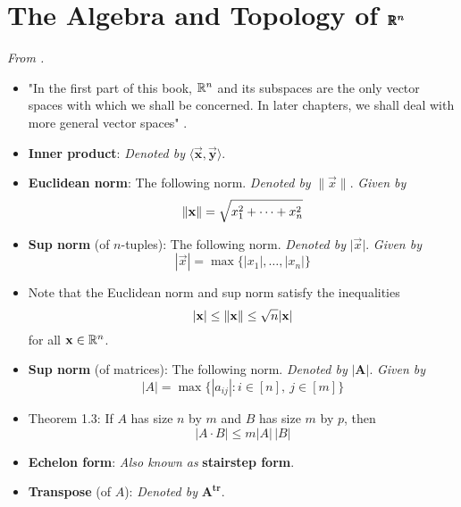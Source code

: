 \documentclass[../notes.tex]{subfiles}
\begin{document}
\section[The Algebra and Topology of \texorpdfstring{$\R^n$}{TEXT}]{The Algebra and Topology of \texorpdfstring{$\pmb{\mathbb{R}}^{\bm{n}}$}{TEXT}}
\emph{From \textcite{bib:Munkres}.}
\begin{itemize}
    \item {}"In the first part of this book, $\R^n$ and its subspaces are the only vector spaces with which we shall be concerned. In later chapters, we shall deal with more general vector spaces" \parencite[2]{bib:Munkres}.
    \item \textbf{Inner product}: \emph{Denoted by} $\bm{\langle\vec{x},\vec{y}\rangle}$.
    \item \textbf{Euclidean norm}: The following norm. \emph{Denoted by} $\pmb{\parallel}\!\vec{x}\!\pmb{\parallel}$. \emph{Given by}
    \begin{equation*}
        \norm{\mathbf{x}} = \sqrt{x_1^2+\cdots+x_n^2}
    \end{equation*}
    \item \textbf{Sup norm} (of $n$-tuples): The following norm. \emph{Denoted by} $\pmb{|}\vec{x}\pmb{|}$. \emph{Given by}
    \begin{equation*}
        |\vec{x}| = \max\{|x_1|,\dots,|x_n|\}
    \end{equation*}
    \item Note that the Euclidean norm and sup norm satisfy the inequalities
    \begin{equation*}
        |\mathbf{x}| \leq \norm{\mathbf{x}} \leq \sqrt{n}|\mathbf{x}|
    \end{equation*}
    for all $\mathbf{x}\in\mathbb{R}^n$.
    \item \textbf{Sup norm} (of matrices): The following norm. \emph{Denoted by} $\pmb{|}\bm{A}\pmb{|}$. \emph{Given by}
    \begin{equation*}
        |A| = \max\{|a_{ij}|:i\in[n],\ j\in[m]\}
    \end{equation*}
    \item Theorem 1.3: If $A$ has size $n$ by $m$ and $B$ has size $m$ by $p$, then
    \begin{equation*}
        |A\cdot B| \leq m|A|\,|B|
    \end{equation*}
    \item \textbf{Echelon form}: \emph{Also known as} \textbf{stairstep form}.
    \item \textbf{Transpose} (of $A$): \emph{Denoted by} $\bm{A^\textbf{tr}}$.

\end{itemize}
\end{document}
